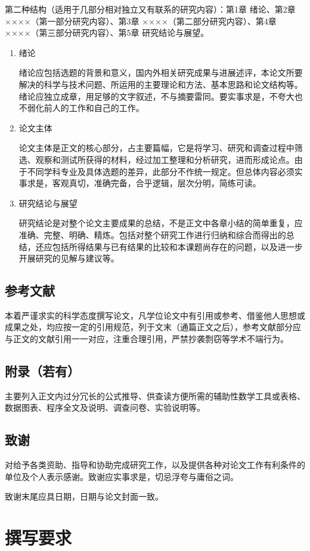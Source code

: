 {第二种结构（适用于几部分相对独立又有联系的研究内容）：第1章 绪论、第2章 ××××（第一部分研究内容）、第3章 ××××（第二部分研究内容）、第4章 ××××（第三部分研究内容）、第5章 研究结论与展望。
\begin{enumerate}
    \item 绪论
    
    绪论应包括选题的背景和意义，国内外相关研究成果与进展述评，本论文所要解决的科学与技术问题、所运用的主要理论和方法、基本思路和论文结构等。绪论应独立成章，用足够的文字叙述，不与摘要雷同。要实事求是，不夸大也不弱化前人的工作和自己的工作。
    \item 论文主体
    
    论文主体是正文的核心部分，占主要篇幅，它是将学习、研究和调查过程中筛选、观察和测试所获得的材料，经过加工整理和分析研究，进而形成论点。由于不同学科专业及具体选题的差异，此部分不作统一规定。但总体内容必须实事求是，客观真切，准确完备，合乎逻辑，层次分明，简练可读。
    
    \item 研究结论与展望
    
    研究结论是对整个论文主要成果的总结，不是正文中各章小结的简单重复，应准确、完整、明确、精炼。包括对整个研究工作进行归纳和综合而得出的总结，还应包括所得结果与已有结果的比较和本课题尚存在的问题，以及进一步开展研究的见解与建议等。
\end{enumerate}
\subsection{参考文献}
本着严谨求实的科学态度撰写论文，凡学位论文中有引用或参考、借鉴他人思想或成果之处，均应按一定的引用规范，列于文末（通篇正文之后），参考文献部分应与正文的文献引用一一对应，注重合理引用，严禁抄袭剽窃等学术不端行为。
\subsection{附录（若有）}
主要列入正文内过分冗长的公式推导、供查读方便所需的辅助性数学工具或表格、数据图表、程序全文及说明、调查问卷、实验说明等。
\subsection{致谢}
对给予各类资助、指导和协助完成研究工作，以及提供各种对论文工作有利条件的单位及个人表示感谢。致谢应实事求是，切忌浮夸与庸俗之词。

致谢末尾应具日期，日期与论文封面一致。


\section{撰写要求}

}
